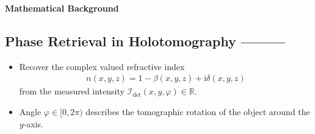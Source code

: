 \documentclass[a1paper, landscape,20pt]{extarticle}
\newcommand{\im}{\mathrm{i}}
\newcommand{\RR}{\mathbb{R}}
\begin{document}
\begin{center}
    {\Huge \textbf{Mathematical Background}}\\[2cm]
\end{center}

\begin{multicols}{3}

\section*{Phase Retrieval in Holotomography ---------}
\begin{itemize}
    \item Recover the complex valued refractive index 
    \begin{align*}
        n \left( x,y,z \right) = 1 - \beta \left( x,y,z \right) + \im \delta \left( x,y,z \right)
    \end{align*}
    from the measured intensity $\mathcal{I}_\mathrm{det} \left( x,y, \varphi \right) \in \RR$.
    \item Angle $\varphi \in [0,2\pi)$ describes the tomographic rotation of the object around the $y$-axis.
\end{itemize}


\end{multicols}
\end{document}

